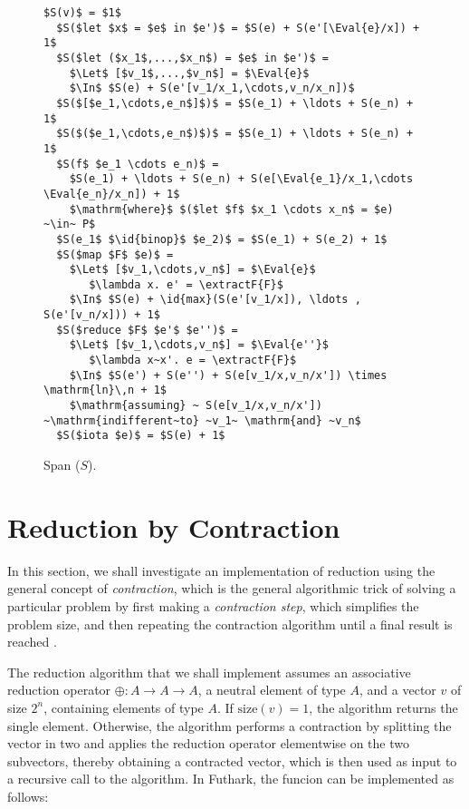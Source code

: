 \documentclass[oneside,11pt]{book}
\begin{document}
\begin{figure}
\begin{lstlisting}[mathescape=true]
  $S(v)$ = $1$
  $S($let $x$ = $e$ in $e')$ = $S(e) + S(e'[\Eval{e}/x]) + 1$
  $S($let ($x_1$,...,$x_n$) = $e$ in $e')$ =
    $\Let$ [$v_1$,...,$v_n$] = $\Eval{e}$
    $\In$ $S(e) + S(e'[v_1/x_1,\cdots,v_n/x_n])$
  $S($[$e_1,\cdots,e_n$]$)$ = $S(e_1) + \ldots + S(e_n) + 1$
  $S($($e_1,\cdots,e_n$)$)$ = $S(e_1) + \ldots + S(e_n) + 1$
  $S(f$ $e_1 \cdots e_n)$ =
    $S(e_1) + \ldots + S(e_n) + S(e[\Eval{e_1}/x_1,\cdots \Eval{e_n}/x_n]) + 1$
    $\mathrm{where}$ $($let $f$ $x_1 \cdots x_n$ = $e) ~\in~ P$
  $S(e_1$ $\id{binop}$ $e_2)$ = $S(e_1) + S(e_2) + 1$
  $S($map $F$ $e)$ =
    $\Let$ [$v_1,\cdots,v_n$] = $\Eval{e}$
       $\lambda x. e' = \extractF{F}$
    $\In$ $S(e) + \id{max}(S(e'[v_1/x]), \ldots , S(e'[v_n/x])) + 1$
  $S($reduce $F$ $e'$ $e'')$ =
    $\Let$ [$v_1,\cdots,v_n$] = $\Eval{e''}$
       $\lambda x~x'. e = \extractF{F}$
    $\In$ $S(e') + S(e'') + S(e[v_1/x,v_n/x']) \times \mathrm{ln}\,n + 1$
    $\mathrm{assuming} ~ S(e[v_1/x,v_n/x']) ~\mathrm{indifferent~to} ~v_1~ \mathrm{and} ~v_n$
  $S($iota $e)$ = $S(e) + 1$
\end{lstlisting}

\caption{Span ($S$).}
\label{fig:span}
\end{figure}

\section{Reduction by Contraction}

In this section, we shall investigate an implementation of reduction
using the general concept of \emph{contraction}, which is the general
algorithmic trick of solving a particular problem by first making a
\emph{contraction step}, which simplifies the problem size, and then
repeating the contraction algorithm until a final result is reached
\cite{algdesign:parseq2016}.

The reduction algorithm that we shall implement assumes an associative
reduction operator $\oplus : A \rightarrow A \rightarrow A$, a neutral
element of type $A$, and a vector $v$ of size $2^n$, containing
elements of type $A$. If $\mathrm{size}(v) = 1$, the algorithm returns
the single element. Otherwise, the algorithm performs a contraction by
splitting the vector in two and applies the reduction operator
elementwise on the two subvectors, thereby obtaining a contracted
vector, which is then used as input to a recursive call to the
algorithm. In Futhark, the funcion  can be implemented as
follows:
\end{document}
